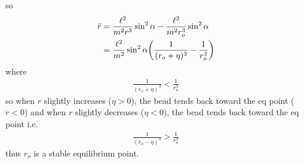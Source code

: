 \documentclass[../hw.tex]{subfiles}
\begin{document}
so
\begin{align*}
    \ddot r &= \frac{\ell^2}{m^2 r^3} \sin^2\alpha - \frac{\ell^2}{m^2 r_o^3} \sin^2\alpha \\
    &= \frac{\ell^2}{m^2} \sin^2\alpha \qt(\frac{1}{(r_o + \eta)^3} - \frac{1}{r_o^3})
\end{align*}
where
\begin{align*}
    \frac{1}{(r_o + \eta)^3} < \frac{1}{r_o^3}
\end{align*}
so when $r$ slightly increases ($\eta > 0$), the bead tends back toward the eq point ($\ddot r < 0$)
and when $r$ slightly decreases ($\eta < 0$), the bead tends back toward the eq point i.e.
\begin{align*}
    \frac{1}{(r_o - \eta)^3} > \frac{1}{r_o^3}
\end{align*}
thus $r_o$ is a stable equilibrium point.

\newpage 
\end{document}
